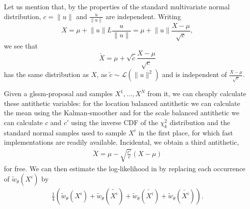 Let us mention that, by the properties of the standard multivariate normal distribution, $ c = \lVert u \rVert $ and $ \frac{u}{ \lVert u \rVert }$ are independent. Writing 
$$
    X = \mu + \lVert u \rVert L \frac{u}{ \lVert u \rVert } = \mu + \lVert u \rVert \frac{X - \mu}{\sqrt{c}},
$$
we see that 
$$
    \check X = \mu + \sqrt{\tilde c}\frac{X - \mu}{\sqrt{c}}
$$
has the same distribution as $X$, as $\tilde c \sim \mathcal L( \lVert u \rVert^{2})$ and is independent of $ \frac{X - \mu}{\sqrt{c}}$. 

Given a \acrshort{glssm}-proposal and samples $X^{1}, \dots, X^{N}$ from it, we can cheaply calculate these antithetic variables: for the location balanced antithetic we can calculate the mean using the Kalman-smoother and for the scale balanced antithetic we can calculate $c$ and $c'$ using the inverse CDF of the $\chi^{2}_{k}$ distribution and the standard normal samples used to sample $X^{i}$ in the first place, for which fast implementations are readily available. Incidental, we obtain a third antithetic, 
\begin{align}
    \label{eq:antithetic-scale-location}
    \breve{X} = \mu - \sqrt{ \frac{c'}{c}} (X - \mu)
\end{align}
for free. We can then estimate the log-likelihood in  by replacing each occurrence of $\tilde w_{\theta}(X^{i})$ by 
\begin{align}
    \label{eq:antithetic-weights}
    \frac{1}{4} \left( \tilde w_{\theta} (X^{i}) + \tilde w_{\theta}(\tilde{X^{i}}) + \tilde w_{\theta}(\check{X^{i}}) + \tilde w_{\theta}(\breve{{X^{i}}}) \right).
\end{align}




